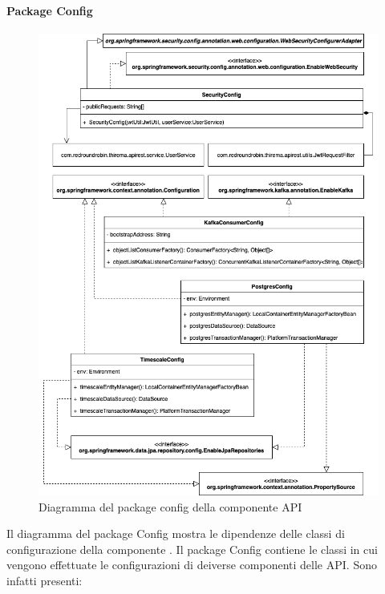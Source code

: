 		\paragraph*{Package Config} 
		\newpage
		\begin{figure}[H]
			\centering
			\includegraphics[scale=0.550]{res/images/API/ConfigPackage.png}
			\caption{Diagramma del package config della componente API}
			\label{Diagramma 12}
		\end{figure}
		\newpage
		Il diagramma del package Config mostra le dipendenze delle classi di configurazione della componente .
		\newline
		Il package Config contiene le classi in cui vengono effettuate le configurazioni di deiverse componenti delle API. Sono infatti presenti:
